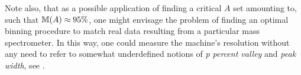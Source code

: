 	Note also, that as a possible application of finding a critical $A$ set amounting to, such that $\mathbb{M}(A) \approx 95\%$, one might envisage the problem of finding an optimal binning procedure to match real data resulting from a particular mass spectrometer. In this way, one could measure the machine's resolution without any need to refer to somewhat underdefined notions of {\it p percent valley} and {\it peak width}, see \cite{Eidhammer2008ComputationalMethodsInMassSpectrometry}.   